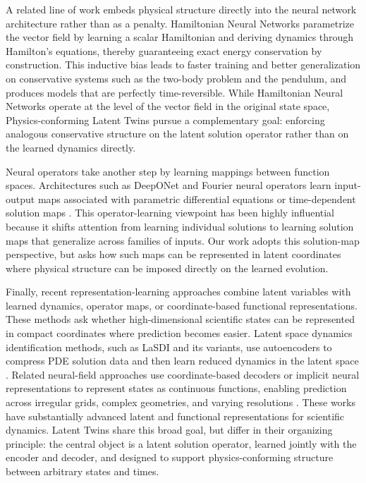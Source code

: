 \documentclass[a4paper,fleqn]{cas-sc}
\theoremstyle{thmstyleone}%
\theoremstyle{thmstyletwo}%
\theoremstyle{thmstylethree}%
\begin{document}
A related line of work embeds physical structure directly into the neural network architecture rather than as a penalty. Hamiltonian Neural Networks \cite{greydanus2019hamiltonian} parametrize the vector field by learning a scalar Hamiltonian and deriving dynamics through Hamilton's equations, thereby guaranteeing exact energy conservation by construction. This inductive bias leads to faster training and better generalization on conservative systems such as the two-body problem and the pendulum, and produces models that are perfectly time-reversible. While Hamiltonian Neural Networks operate at the level of the vector field in the original state space, Physics-conforming Latent Twins pursue a complementary goal: enforcing analogous conservative structure on the latent solution operator rather than on the learned dynamics directly.

Neural operators take another step by learning mappings between function spaces. Architectures such as DeepONet and Fourier neural operators learn input-output maps associated with parametric differential equations or time-dependent solution maps \cite{lu2021learning,li2020fourier,kovachki2023neural}. This operator-learning viewpoint has been highly influential because it shifts attention from learning individual solutions to learning solution maps that generalize across families of inputs. Our work adopts this solution-map perspective, but asks how such maps can be represented in latent coordinates where physical structure can be imposed directly on the learned evolution.

Finally, recent representation-learning approaches combine latent variables with learned dynamics, operator maps, or coordinate-based functional representations. These methods ask whether high-dimensional scientific states can be represented in compact coordinates where prediction becomes easier. Latent space dynamics identification methods, such as LaSDI and its variants, use autoencoders to compress PDE solution data and then learn reduced dynamics in the latent space \cite{fries2022lasdi,he2023glasdi,tran2024weak,park2024tlasdi}. Related neural-field approaches use coordinate-based decoders or implicit neural representations to represent states as continuous functions, enabling prediction across irregular grids, complex geometries, and varying resolutions \cite{chen2022crom,serrano2023operator,yin2022continuous}. These works have substantially advanced latent and functional representations for scientific dynamics. Latent Twins share this broad goal, but differ in their organizing principle: the central object is a latent solution operator, learned jointly with the encoder and decoder, and designed to support physics-conforming structure between arbitrary states and times.
\end{document}
